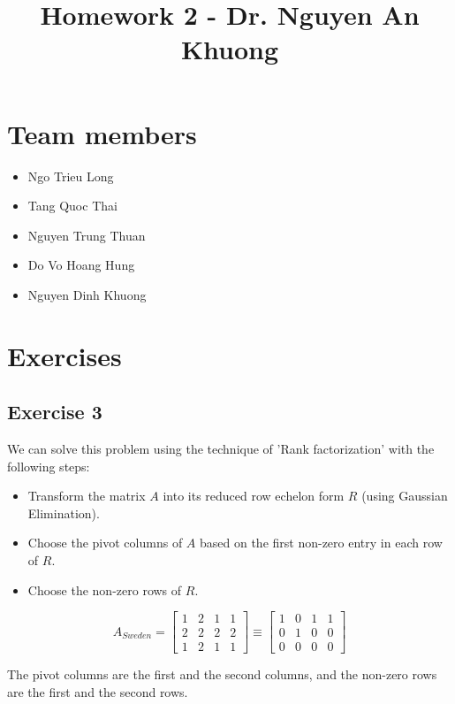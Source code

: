 \documentclass{article}
\author{}
\begin{document}
\title{Homework 2 - Dr. Nguyen An Khuong}
\maketitle
\section{Team members}
\begin{itemize}
    \item Ngo Trieu Long
    \item Tang Quoc Thai
    \item Nguyen Trung Thuan
    \item Do Vo Hoang Hung
    \item Nguyen Dinh Khuong
\end{itemize}

\section{Exercises}
\subsection{Exercise 3}
We can solve this problem using the technique of 'Rank factorization' with the following steps:

\begin{itemize}
    \item Transform the matrix $A$ into its reduced row echelon form $R$ (using Gaussian Elimination).
    \item Choose the pivot columns of $A$ based on the first non-zero entry in each row of $R$.
    \item Choose the non-zero rows of $R$.
\end{itemize}

\[A_{Sweden} =
    \begin{bmatrix}
        1 & 2 & 1 & 1 \\
        2 & 2 & 2 & 2 \\
        1 & 2 & 1 & 1
    \end{bmatrix}
    \equiv
    \begin{bmatrix}
        1 & 0 & 1 & 1 \\
        0 & 1 & 0 & 0 \\
        0 & 0 & 0 & 0
    \end{bmatrix}
\]

The pivot columns are the first and the second columns, and the non-zero rows are the first and the second rows.
\end{document}
